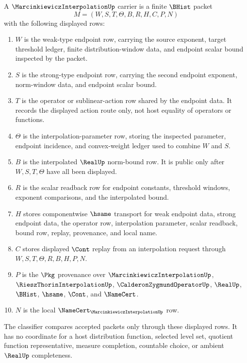 \begin{definition}
\label{def:marcinkiewicz-interpolation-carrier}
A $\MarcinkiewiczInterpolationUp$ carrier is a finite $\BHist$ packet
$$
M=(W,S,T,\Theta,B,R,H,C,P,N)
$$
with the following displayed rows:
\begin{enumerate}
\item $W$ is the weak-type endpoint row, carrying the source exponent, target threshold ledger, finite distribution-window data, and endpoint scalar bound inspected by the packet.
\item $S$ is the strong-type endpoint row, carrying the second endpoint exponent, norm-window data, and endpoint scalar bound.
\item $T$ is the operator or sublinear-action row shared by the endpoint data. It records the displayed action route only, not host equality of operators or functions.
\item $\Theta$ is the interpolation-parameter row, storing the inspected parameter, endpoint incidence, and convex-weight ledger used to combine $W$ and $S$.
\item $B$ is the interpolated $\RealUp$ norm-bound row. It is public only after $W,S,T,\Theta$ have all been displayed.
\item $R$ is the scalar readback row for endpoint constants, threshold windows, exponent comparisons, and the interpolated bound.
\item $H$ stores componentwise $\hsame$ transport for weak endpoint data, strong endpoint data, the operator row, interpolation parameter, scalar readback, bound row, replay, provenance, and local name.
\item $C$ stores displayed $\Cont$ replay from an interpolation request through $W,S,T,\Theta,R,B,H,P,N$.
\item $P$ is the $\Pkg$ provenance over $\MarcinkiewiczInterpolationUp$, $\RieszThorinInterpolationUp$, $\CalderonZygmundOperatorUp$, $\RealUp$, $\BHist$, $\hsame$, $\Cont$, and $\NameCert$.
\item $N$ is the local $\NameCert_{\MarcinkiewiczInterpolationUp}$ row.
\end{enumerate}
The classifier compares accepted packets only through these displayed rows. It has no coordinate for a host distribution function, selected level set, quotient function representative, measure completion, countable choice, or ambient $\RealUp$ completeness.
\end{definition}

